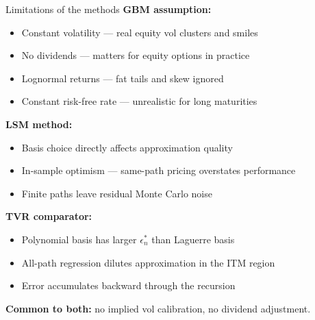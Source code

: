 \documentclass[
  11pt,
  ignorenonframetext,
  aspectratio=169,
]{beamer}
\providecommand{\tightlist}{%
  \setlength{\itemsep}{0pt}\setlength{\parskip}{0pt}}
\begin{document}
\begin{frame}{Limitations of the methods}
\label{limitations-of-the-methods}
\textbf{GBM assumption:}

\begin{itemize}
\tightlist
\item
  Constant volatility --- real equity vol clusters and smiles
\item
  No dividends --- matters for equity options in practice
\item
  Lognormal returns --- fat tails and skew ignored
\item
  Constant risk-free rate --- unrealistic for long maturities
\end{itemize}

\textbf{LSM method:}

\begin{itemize}
\tightlist
\item
  Basis choice directly affects approximation quality
\item
  In-sample optimism --- same-path pricing overstates performance
\item
  Finite paths leave residual Monte Carlo noise
\end{itemize}

\textbf{TVR comparator:}

\begin{itemize}
\tightlist
\item
  Polynomial basis has larger \(\epsilon_n^*\) than Laguerre basis
\item
  All-path regression dilutes approximation in the ITM region
\item
  Error accumulates backward through the recursion
\end{itemize}

\textbf{Common to both:} no implied vol calibration, no dividend
adjustment.
\end{frame}
\end{document}
